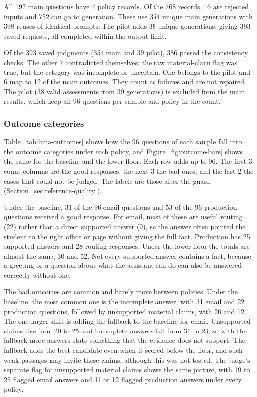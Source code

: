 All 192 main questions have 4 policy records. Of the 768 records, 16 are rejected inputs and 752 can go to generation. These use 354 unique main generations with 398 reuses of identical prompts. The pilot adds 39 unique generations, giving 393 saved requests, all completed within the output limit.

Of the 393 saved judgments (354 main and 39 pilot), 386 passed the consistency checks. The other 7 contradicted themselves: the raw material-claim flag was true, but the category was incomplete or uncertain. One belongs to the pilot and 6 map to 12 of the main outcomes. They count as failures and are not repaired. The pilot (38 valid assessments from 39 generations) is excluded from the main results, which keep all 96 questions per sample and policy in the count.

\subsubsection{Outcome categories}

Table~\ref{tab:luna-outcomes} shows how the 96 questions of each sample fall into the outcome categories under each policy, and Figure~\ref{fig:outcome-bars} shows the same for the baseline and the lower floor. Each row adds up to 96. The first 3 count columns are the good responses, the next 3 the bad ones, and the last 2 the cases that could not be judged. The labels are those after the guard (Section~\ref{sec:reference-quality}).





Under the baseline, 31 of the 96 email questions and 53 of the 96 production questions received a good response. For email, most of these are useful routing (22) rather than a direct supported answer (9), so the answer often pointed the student to the right office or page without giving the full fact. Production has 25 supported answers and 28 routing responses. Under the lower floor the totals are almost the same, 30 and 52. Not every supported answer contains a fact, because a greeting or a question about what the assistant can do can also be answered correctly without one.

The bad outcomes are common and barely move between policies. Under the baseline, the most common one is the incomplete answer, with 31 email and 22 production questions, followed by unsupported material claims, with 20 and 12. The one larger shift is adding the fallback to the baseline for email. Unsupported claims rise from 20 to 25 and incomplete answers fall from 31 to 23, so with the fallback more answers state something that the evidence does not support. The fallback adds the best candidate even when it scored below the floor, and such weak passages may invite these claims, although this was not tested. The judge's separate flag for unsupported material claims shows the same picture, with 19 to 25 flagged email answers and 11 or 12 flagged production answers under every policy.

